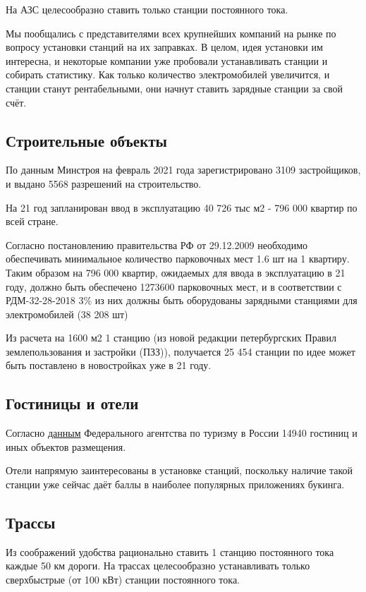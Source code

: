 \documentclass[a4paper,12pt]{report}
\begin{document}
На АЗС целесообразно ставить только станции постоянного тока.

Мы пообщались с представителями всех крупнейших компаний на рынке по вопросу установки станций на их заправках. В целом, идея установки им интересна, и некоторые компании уже пробовали устанавливать станции и собирать статистику. Как только количество электромобилей увеличится, и станции станут рентабельными, они начнут ставить зарядные станции за свой счёт. 

\subsection{Строительные объекты}

По данным Минстроя на февраль 2021 года зарегистрировано 3109 застройщиков, и выдано 5568 разрешений на строительство.

На 21 год запланирован ввод в эксплуатацию 40 726 тыс м2 - 796 000 квартир по всей стране. 

Согласно постановлению правительства РФ от 29.12.2009 необходимо обеспечивать минимальное количество парковочных мест 1.6 шт на 1 квартиру. Таким образом на 796 000 квартир, ожидаемых для ввода в эксплуатацию в 21 году, должно быть обеспечено 1273600 парковочных мест, и в соответствии с РДМ-32-28-2018 3\% из них должны быть оборудованы зарядными станциями для электромобилей (38 208 шт)

Из расчета на 1600 м2 1 станцию (из новой редакции петербургских Правил землепользования и застройки (ПЗЗ)), получается 25 454 станции по идее может быть поставлено в новостройках уже в 21 году.

\subsection{Гостиницы и отели}

Согласно \href{https://классификация-туризм.рф/displayAccommodation/index}{данным} Федерального агентства по туризму в России 14940 гостиниц и иных объектов размещения. 

Отели напрямую заинтересованы в установке станций, поскольку наличие такой станции уже сейчас даёт баллы в наиболее популярных приложениях букинга. 

\subsection{Трассы}

Из соображений удобства рационально ставить 1 станцию постоянного тока каждые 50 км дороги. На трассах целесообразно устанавливать только сверхбыстрые (от 100 кВт) станции постоянного тока. 
\end{document}
